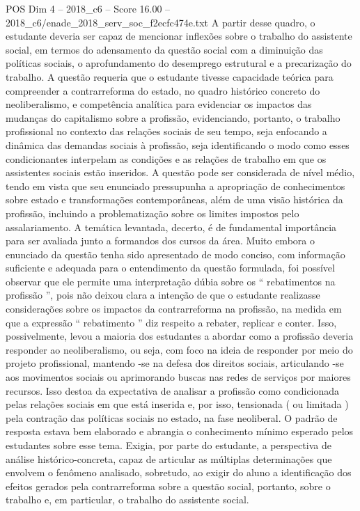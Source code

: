 \begin{textsample}{POS Dim 4 – 2018\_c6 – Score 16.00 – 2018\_c6/enade\_2018\_serv\_soc\_f2ecfc474e.txt}
A partir desse quadro, o estudante deveria ser capaz de mencionar inflexões sobre o trabalho do assistente social, em termos do adensamento da questão social com a diminuição das políticas sociais, o aprofundamento do desemprego estrutural e a precarização do trabalho.
A questão requeria que o estudante tivesse capacidade teórica para compreender a contrarreforma do estado, no quadro histórico concreto do neoliberalismo, e competência analítica para evidenciar os impactos das mudanças do capitalismo sobre a profissão, evidenciando, portanto, o trabalho profissional no contexto das relações sociais de seu tempo, seja enfocando a dinâmica das demandas sociais à profissão, seja identificando o modo como esses condicionantes interpelam as condições e as relações de trabalho em que os assistentes sociais estão inseridos.
A questão pode ser considerada de nível médio, tendo em vista que seu enunciado pressupunha a apropriação de conhecimentos sobre estado e transformações contemporâneas, além de uma visão histórica da profissão, incluindo a problematização sobre os limites impostos pelo assalariamento.
A temática levantada, decerto, é de fundamental importância para ser avaliada junto a formandos dos cursos da área.
Muito embora o enunciado da questão tenha sido apresentado de modo conciso, com informação suficiente e adequada para o entendimento da questão formulada, foi possível observar que ele permite uma interpretação dúbia sobre os “ rebatimentos na profissão ”, pois não deixou clara a intenção de que o estudante realizasse considerações sobre os impactos da contrarreforma na profissão, na medida em que a expressão “ rebatimento ” diz respeito a rebater, replicar e conter.
Isso, possivelmente, levou a maioria dos estudantes a abordar como a profissão deveria responder ao neoliberalismo, ou seja, com foco na ideia de responder por meio do projeto profissional, mantendo -se na defesa dos direitos sociais, articulando -se aos movimentos sociais ou aprimorando buscas nas redes de serviços por maiores recursos.
Isso destoa da expectativa de analisar a profissão como condicionada pelas relações sociais em que está inserida e, por isso, tensionada ( ou limitada ) pela contração das políticas sociais no estado, na fase neoliberal.
O padrão de resposta estava bem elaborado e abrangia o conhecimento mínimo esperado pelos estudantes sobre esse tema.
Exigia, por parte do estudante, a perspectiva de análise histórico-concreta, capaz de articular as múltiplas determinações que envolvem o fenômeno analisado, sobretudo, ao exigir do aluno a identificação dos efeitos gerados pela contrarreforma sobre a questão social, portanto, sobre o trabalho e, em particular, o trabalho do assistente social.

\end{textsample}
